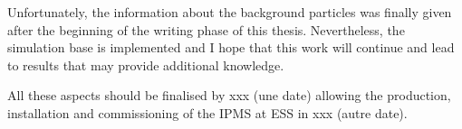 Unfortunately, the information about the background particles was finally given after the beginning of the writing phase of this thesis. Nevertheless, the simulation base is implemented and I hope that this work will continue and lead to results that may provide additional knowledge.

All these aspects should be finalised by xxx (une date) allowing the production, installation and commissioning of the IPMS at ESS in xxx (autre date).





